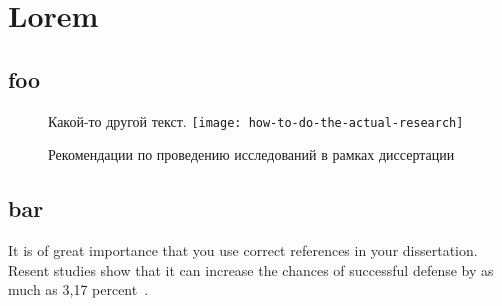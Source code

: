 \chapter{Lorem}

\section{foo}

\blindtext

\begin{figure}[htbp]
\centering
Какой-то другой текст.
\texttt{[image: how-to-do-the-actual-research]}
\caption{Рекомендации по проведению исследований в рамках диссертации}%
\label{fig:how-to-do-research}
\end{figure}

\Blindtext

\section{bar}

\blindtext
It is of great importance that you use correct references in your dissertation.
Resent studies show that it can increase the chances of successful defense
by as much as 3,17 percent~\cite{big,small,russian}.

\Blindtext
